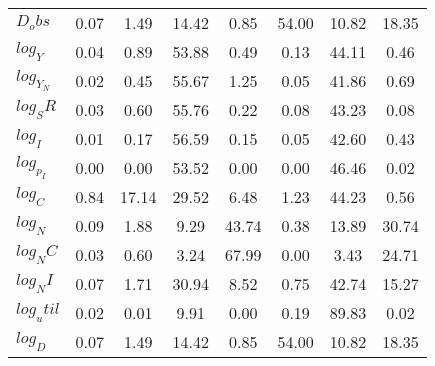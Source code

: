 \begin{center}
\begin{longtable}{lccccccc}
$D_obs     $	 & 	        0.07	 & 	        1.49	 & 	       14.42	 & 	        0.85	 & 	       54.00	 & 	       10.82	 & 	       18.35 \\ 
$log_Y     $	 & 	        0.04	 & 	        0.89	 & 	       53.88	 & 	        0.49	 & 	        0.13	 & 	       44.11	 & 	        0.46 \\ 
$log_Y_N   $	 & 	        0.02	 & 	        0.45	 & 	       55.67	 & 	        1.25	 & 	        0.05	 & 	       41.86	 & 	        0.69 \\ 
$log_SR    $	 & 	        0.03	 & 	        0.60	 & 	       55.76	 & 	        0.22	 & 	        0.08	 & 	       43.23	 & 	        0.08 \\ 
$log_I     $	 & 	        0.01	 & 	        0.17	 & 	       56.59	 & 	        0.15	 & 	        0.05	 & 	       42.60	 & 	        0.43 \\ 
$log_p_I   $	 & 	        0.00	 & 	        0.00	 & 	       53.52	 & 	        0.00	 & 	        0.00	 & 	       46.46	 & 	        0.02 \\ 
$log_C     $	 & 	        0.84	 & 	       17.14	 & 	       29.52	 & 	        6.48	 & 	        1.23	 & 	       44.23	 & 	        0.56 \\ 
$log_N     $	 & 	        0.09	 & 	        1.88	 & 	        9.29	 & 	       43.74	 & 	        0.38	 & 	       13.89	 & 	       30.74 \\ 
$log_NC    $	 & 	        0.03	 & 	        0.60	 & 	        3.24	 & 	       67.99	 & 	        0.00	 & 	        3.43	 & 	       24.71 \\ 
$log_NI    $	 & 	        0.07	 & 	        1.71	 & 	       30.94	 & 	        8.52	 & 	        0.75	 & 	       42.74	 & 	       15.27 \\ 
$log_util  $	 & 	        0.02	 & 	        0.01	 & 	        9.91	 & 	        0.00	 & 	        0.19	 & 	       89.83	 & 	        0.02 \\ 
$log_D     $	 & 	        0.07	 & 	        1.49	 & 	       14.42	 & 	        0.85	 & 	       54.00	 & 	       10.82	 & 	       18.35 \\ 
\end{longtable}
 \end{center}
